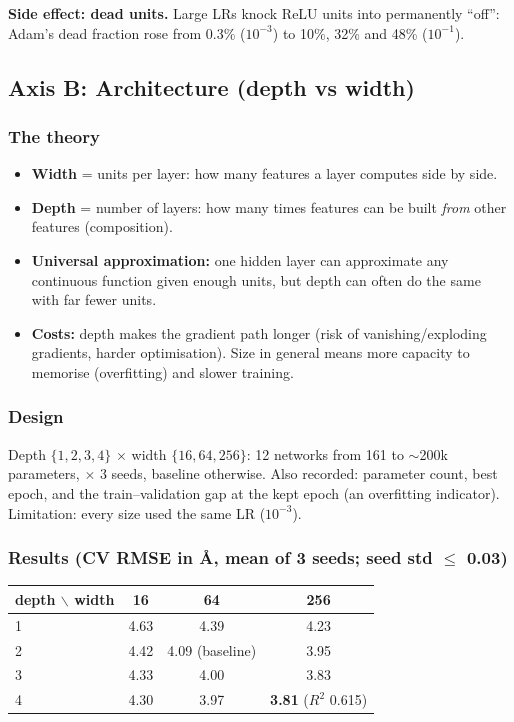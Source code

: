 \documentclass[11pt,a4paper]{article}
\begin{document}
\textbf{Side effect: dead units.} Large LRs knock ReLU units into permanently ``off'': Adam's dead fraction rose from 0.3\%
($10^{-3}$) to 10\%, 32\% and 48\% ($10^{-1}$).

\subsection{Axis B: Architecture (depth vs width)}

\subsubsection*{The theory}
\begin{itemize}
  \item \textbf{Width} = units per layer: how many features a layer computes side by side.
  \item \textbf{Depth} = number of layers: how many times features can be built \emph{from} other features (composition).
  \item \textbf{Universal approximation:} one hidden layer can approximate any continuous function given enough units, but
        depth can often do the same with far fewer units.
  \item \textbf{Costs:} depth makes the gradient path longer (risk of vanishing/exploding gradients, harder optimisation).
        Size in general means more capacity to memorise (overfitting) and slower training.
\end{itemize}

\subsubsection*{Design}
Depth $\{1,2,3,4\}$ $\times$ width $\{16, 64, 256\}$: 12 networks from 161 to $\sim$200k parameters, $\times$ 3 seeds,
baseline otherwise. Also recorded: parameter count, best epoch, and the train--validation gap at the kept epoch (an
overfitting indicator). Limitation: every size used the same LR ($10^{-3}$).

\subsubsection*{Results (CV RMSE in \AA, mean of 3 seeds; seed std $\leq$ 0.03)}
\begin{center}
\begin{tabular}{@{}lccc@{}}
\toprule
depth $\backslash$ width & 16 & 64 & 256 \\
\midrule
1 & 4.63 & 4.39 & 4.23 \\
2 & 4.42 & 4.09 (baseline) & 3.95 \\
3 & 4.33 & 4.00 & 3.83 \\
4 & 4.30 & 3.97 & \textbf{3.81} ($R^2$ 0.615) \\
\bottomrule
\end{tabular}
\end{center}
\end{document}

